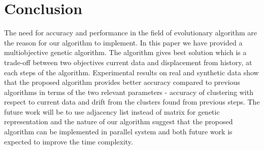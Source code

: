 \documentclass[12pt]{arsubmit}
\begin{document}
\section {Conclusion}
The need for accuracy and performance in the field of evolutionary algorithm are the reason for our algorithm to implement. In this paper we have provided a multiobjective genetic algorithm.  The algorithm gives best solution which is a trade-off between two objectives current data and displacement from history, at each steps of the algorithm. Experimental results on real and synthetic data show that the proposed algorithm provides better accuracy compared to previous algorithms in terms of the two relevant parameters - accuracy of clustering with respect to current data and drift from the clusters found from previous steps. The future work will be to use adjacency list instead of matrix for genetic representation and the nature of our algorithm suggest that the proposed algorithm can be implemented in parallel system and both future work is expected to improve the time complexity.
 

\end{document}
